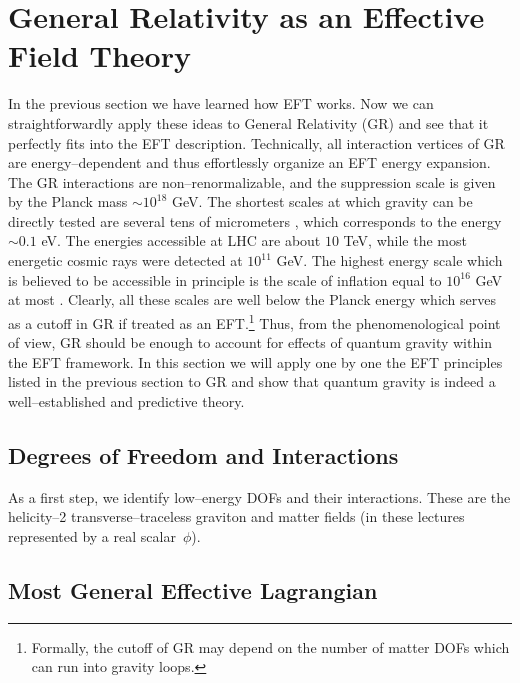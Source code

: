 \documentclass[12pt]{article}
\begin{document}
\section{General Relativity as an Effective Field Theory}

In the previous section we have learned
how EFT works. Now we can straightforwardly apply these ideas to
General Relativity (GR) and see that it perfectly fits into the EFT description.
Technically, all interaction vertices of GR are energy--dependent and thus effortlessly
organize an EFT energy expansion.
The GR interactions are non--renormalizable, and the suppression scale is given by the Planck mass $\sim 10^{18}$ GeV.
The shortest scales at which gravity can be directly tested are several tens of micrometers \cite{Tan:2016vwu}, which corresponds to the energy $\sim 0.1$ eV.
The energies accessible at LHC are about $10$ TeV, while the most energetic cosmic rays were detected
at $10^{11}$ GeV.
The highest energy scale which is believed to be accessible in principle
is the scale of inflation equal to $10^{16}$ GeV at most \cite{Planck:2013jfk}.
Clearly, all these scales are well below the Planck energy which serves as a cutoff
in GR if treated as an EFT.\footnote{Formally, the cutoff of GR may depend on the number of matter DOFs which can run into gravity loops.}
Thus, from the phenomenological point of view,
GR should be enough to account for effects of quantum gravity within the EFT framework.
In this section we will apply one by one the EFT principles listed in the previous section to GR
and show that quantum gravity is indeed a well--established and predictive theory.

\subsection{Degrees of Freedom and Interactions}

As a first step, we identify low--energy DOFs and their interactions. These are
the helicity--2 transverse--traceless graviton and matter fields (in these lectures represented by a real scalar~$\phi$).

\subsection{Most General Effective Lagrangian}
\label{sec:larg}
\end{document}

